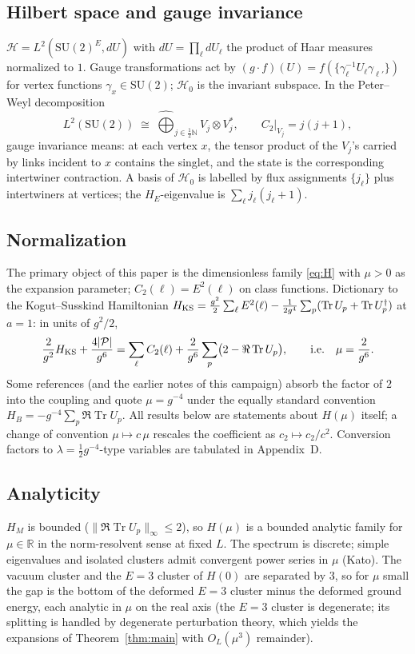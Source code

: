 \documentclass[11pt]{article}
\newcommand{\Tr}{\operatorname{Tr}}
\newcommand{\G}{{\mathrm{SU}}(2)}
\begin{document}
\subsection{Hilbert space and gauge invariance}
$\mathcal H=L^2(\G^E,dU)$ with $dU=\prod_\ell dU_\ell$ the product of Haar
measures normalized to $1$. Gauge transformations act by
$(g\cdot f)(U)=f(\{\gamma_\ell^{-1}U_\ell\gamma_{\ell'}\})$ for vertex
functions $\gamma_x\in\G$; $\mathcal H_0$ is the invariant subspace. In the
Peter--Weyl decomposition
\[
L^2(\G)\;\cong\;\widehat{\bigoplus}_{j\in\frac12\mathbb N}
V_j\otimes V_j^*,\qquad C_2\big|_{V_j}=j(j+1),
\]
gauge invariance means: at each vertex $x$, the tensor product of the
$V_j$'s carried by links incident to $x$ contains the singlet, and the state
is the corresponding intertwiner contraction. A basis of $\mathcal H_0$ is
labelled by flux assignments $\{j_\ell\}$ plus intertwiners at vertices; the
$H_E$-eigenvalue is $\sum_\ell j_\ell(j_\ell+1)$.

\subsection{Normalization}
The primary object of this paper is the dimensionless family \eqref{eq:H}
with $\mu>0$ as the expansion parameter; $C_2(\ell)=E^2(\ell)$ on class
functions. Dictionary to the Kogut--Susskind Hamiltonian
$H_{\rm KS}=\frac{g^2}{2}\sum_\ell E^2(\ell)
-\frac{1}{2g^4}\sum_p(\Tr U_p+\Tr U_p^\dagger)$ at $a=1$: in units of
$g^2/2$,
\[
\frac{2}{g^2}H_{\rm KS}+\frac{4|\mathcal P|}{g^6}
=\sum_\ell C_2(\ell)+\frac{2}{g^6}\sum_p\bigl(2-\Re\Tr U_p\bigr),
\qquad\text{i.e.}\quad \mu=\frac{2}{g^6} .
\]
Some references (and the earlier notes of this campaign) absorb the factor of
$2$ into the coupling and quote $\mu=g^{-4}$ under the equally standard
convention $H_B=-g^{-4}\sum_p\Re\Tr U_p$. All results below are statements
about $H(\mu)$ itself; a change of convention $\mu\mapsto c\,\mu$ rescales
the coefficient as $c_2\mapsto c_2/c^2$. Conversion factors to
$\lambda=\tfrac12 g^{-4}$-type variables are tabulated in Appendix~D.

\subsection{Analyticity}
$H_M$ is bounded ($\|\Re\Tr U_p\|_\infty\le 2$), so $H(\mu)$ is a bounded
analytic family for $\mu\in\mathbb R$ in the norm-resolvent sense at fixed
$L$. The spectrum is discrete; simple eigenvalues and isolated clusters admit
convergent power series in $\mu$ (Kato). The vacuum cluster and the
$E=3$ cluster of $H(0)$ are separated by $3$, so for $\mu$ small the gap is
the bottom of the deformed $E=3$ cluster minus the deformed ground energy,
each analytic in $\mu$ on the real axis (the $E=3$ cluster is degenerate; its
splitting is handled by degenerate perturbation theory, which yields the
expansions of Theorem~\ref{thm:main} with $O_L(\mu^3)$ remainder).
\end{document}

